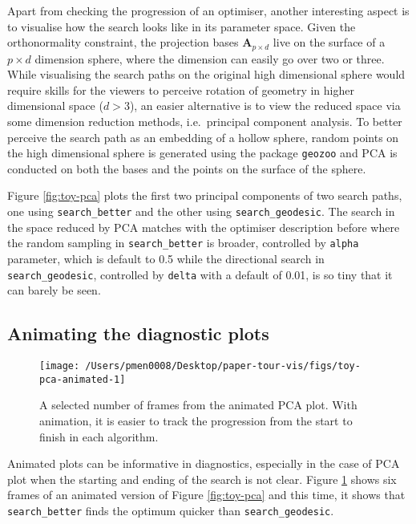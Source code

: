 \documentclass[12pt]{article}
\begin{document}
Apart from checking the progression of an optimiser, another interesting aspect is to visualise how the search looks like in its parameter space. Given the orthonormality constraint, the projection bases \(\mathbf{A}_{p \times d}\) live on the surface of a \(p \times d\) dimension sphere, where the dimension can easily go over two or three. While visualising the search paths on the original high dimensional sphere would require skills for the viewers to perceive rotation of geometry in higher dimensional space (\(d > 3\)), an easier alternative is to view the reduced space via some dimension reduction methods, i.e.~principal component analysis. To better perceive the search path as an embedding of a hollow sphere, random points on the high dimensional sphere is generated using the package \texttt{geozoo} and PCA is conducted on both the bases and the points on the surface of the sphere.

Figure \ref{fig:toy-pca} plots the first two principal components of two search paths, one using \texttt{search\_better} and the other using \texttt{search\_geodesic}. The search in the space reduced by PCA matches with the optimiser description before where the random sampling in \texttt{search\_better} is broader, controlled by \texttt{alpha} parameter, which is default to 0.5 while the directional search in \texttt{search\_geodesic}, controlled by \texttt{delta} with a default of 0.01, is so tiny that it can barely be seen.

\hypertarget{animating-the-diagnostic-plots}{%
\subsection{Animating the diagnostic plots}\label{animating-the-diagnostic-plots}}

\begin{figure}

{\centering \texttt{[image: /Users/pmen0008/Desktop/paper-tour-vis/figs/toy-pca-animated-1]} 

}

\caption{A selected number of frames from the animated PCA plot. With animation, it is easier to track the progression from the start to finish in each algorithm.}\label{fig:toy-pca-animated}
\end{figure}



Animated plots can be informative in diagnostics, especially in the case of PCA plot when the starting and ending of the search is not clear. Figure \ref{fig:toy-pca-animated} shows six frames of an animated version of Figure \ref{fig:toy-pca} and this time, it shows that \texttt{search\_better} finds the optimum quicker than \texttt{search\_geodesic}.
\end{document}
